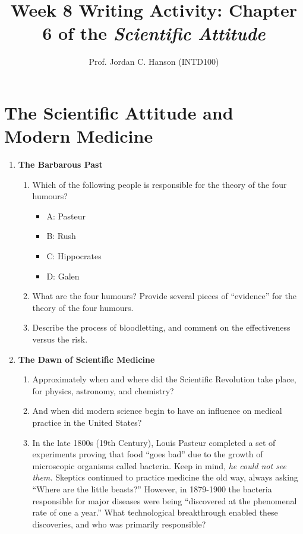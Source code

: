 \documentclass{article}
\begin{document}
\title{Week 8 Writing Activity: Chapter 6 of the \textit{Scientific Attitude}}
\author{Prof. Jordan C. Hanson (INTD100)}

\maketitle

\section{The Scientific Attitude and Modern Medicine}

\begin{enumerate}
\item \textbf{The Barbarous Past}
\begin{enumerate}
\item Which of the following people is responsible for the theory of the four humours?
\begin{itemize}
\item A: Pasteur
\item B: Rush
\item C: Hippocrates
\item D: Galen
\end{itemize}
\item What are the four humours?  Provide several pieces of ``evidence'' for the theory of the four humours. \\ \vspace{1cm}
\item Describe the process of bloodletting, and comment on the effectiveness versus the risk. \\ \vspace{1cm}
\end{enumerate}
\item \textbf{The Dawn of Scientific Medicine}
\begin{enumerate}
\item Approximately when and where did the Scientific Revolution take place, for physics, astronomy, and chemistry? \\ \vspace{1cm}
\item And when did modern science begin to have an influence on medical practice in the United States? \\ \vspace{1cm}
\item In the late 1800s (19th Century), Louis Pasteur completed a set of experiments proving that food ``goes bad'' due to the growth of microscopic organisms called bacteria.  Keep in mind, \textit{he could not see them.}  Skeptics continued to practice medicine the old way, always asking ``Where are the little beasts?''  However, in 1879-1900 the bacteria responsible for major diseases were being ``discovered at the phenomenal rate of one a year.''  What technological breakthrough enabled these discoveries, and who was primarily responsible? \\ \vspace{1.5cm}

\end{enumerate}
\end{enumerate}
\end{document}
